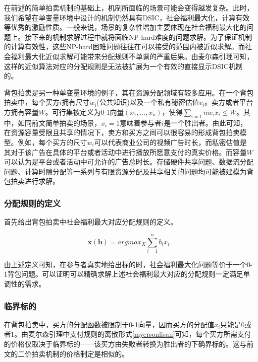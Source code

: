 \documentclass[promaster]{thesis-uestc}
\begin{document}
在前述的简单拍卖机制的基础上，机制所面临的场景可能会变得越发复杂。此时，我们希望在单变量环境中设计的机制仍然具有DSIC，社会福利最大化，计算有效等优秀的激励性质。一般来说，场景的复杂性增加主要体现在社会福利最大化的问题上。接下来的机制求解过程中就将面临NP-hard难度的问题求解。为了保证机制的计算有效性，这些NP-hard困难问题往往在可以接受的范围内被近似求解。而社会福利最大化近似求解可能带来分配规则不单调的严重后果。由麦尔森引理可知，这样的近似算法对应的分配规则是无法被扩展为一个有效的直接显示DSIC机制的。

背包拍卖是另一种单变量环境的例子，其在资源分配领域有较多应用。在一个背包拍卖中，每个买方$i$拥有尺寸$w_i$(公共知识)以及一个私有秘密估值$v_i$。卖方或者平台方拥有容量$W$。可行集被定义为0-1向量$(x_1,...,x_n)$，使得$\sum_{i=1}{n}{w_ix_i}\leq W$。其中，如同前文简单拍卖的场景，$x_i=1$意味着参与者$i$是一个胜出者。由此可知，在资源容量受限且共享的情况下，卖方和买方之间可以很容易的形成背包拍卖模型。例如，每个买方的尺寸$w_i$可以代表商业公司的视频广告时长，而私密估值是其对于该广告在具体的平台或者活动中进行播放所愿意支付的真实价格。而容量$W$可以认为是平台或者活动中可允许的广告总时长。存储硬件共享问题、数据流分配问题、计算时隙分配等一系列与有限资源分配及共享相关的问题均可能被建模为背包拍卖进行求解。

\subsubsection{分配规则的定义}

首先给出背包拍卖中社会福利最大对应分配规则的定义。

\begin{definition}[背包拍卖对应的分配规则]
    $$\mathbf{x(b)}=argmax_X{\sum_{i=1}^{n}{b_ix_i}}$$
\end{definition}

由上述定义可知，在参与者真实地给出标的时，社会福利最大化问题等价于一个0-1背包问题。可以证明可以精确求解上述社会福利最大对应的分配规则一定满足单调性的需求。

\subsubsection{临界标的}
在背包拍卖中，买方的分配函数被限制于0-1向量，因而买方的分配值$x_i$只能是0或者1。由麦尔森引理中支付规则的离散形式\ref{myersonlisan}可知，每个买方所需支付的价格仅取决于临界标的——该买方由失败者转换为胜出者的下确界标的。这与前文的二价拍卖机制的价格制定是相似的。
\end{document}
